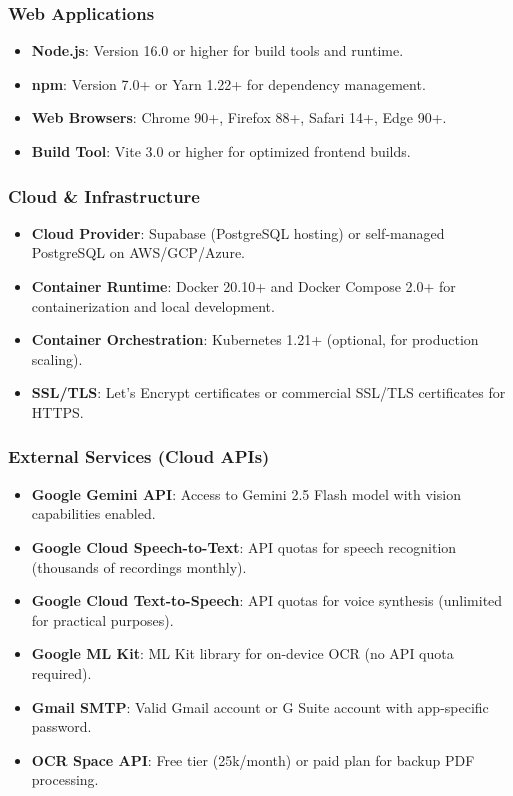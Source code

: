 \subsubsection{Web Applications}
\begin{itemize}
    \item \textbf{Node.js}: Version 16.0 or higher for build tools and runtime.
    \item \textbf{npm}: Version 7.0+ or Yarn 1.22+ for dependency management.
    \item \textbf{Web Browsers}: Chrome 90+, Firefox 88+, Safari 14+, Edge 90+.
    \item \textbf{Build Tool}: Vite 3.0 or higher for optimized frontend builds.
\end{itemize}

\subsubsection{Cloud \& Infrastructure}
\begin{itemize}
    \item \textbf{Cloud Provider}: Supabase (PostgreSQL hosting) or self-managed PostgreSQL on AWS/GCP/Azure.
    \item \textbf{Container Runtime}: Docker 20.10+ and Docker Compose 2.0+ for containerization and local development.
    \item \textbf{Container Orchestration}: Kubernetes 1.21+ (optional, for production scaling).
    \item \textbf{SSL/TLS}: Let's Encrypt certificates or commercial SSL/TLS certificates for HTTPS.
\end{itemize}

\subsubsection{External Services (Cloud APIs)}
\begin{itemize}
    \item \textbf{Google Gemini API}: Access to Gemini 2.5 Flash model with vision capabilities enabled.
    \item \textbf{Google Cloud Speech-to-Text}: API quotas for speech recognition (thousands of recordings monthly).
    \item \textbf{Google Cloud Text-to-Speech}: API quotas for voice synthesis (unlimited for practical purposes).
    \item \textbf{Google ML Kit}: ML Kit library for on-device OCR (no API quota required).
    \item \textbf{Gmail SMTP}: Valid Gmail account or G Suite account with app-specific password.
    \item \textbf{OCR Space API}: Free tier (25k/month) or paid plan for backup PDF processing.
\end{itemize}

